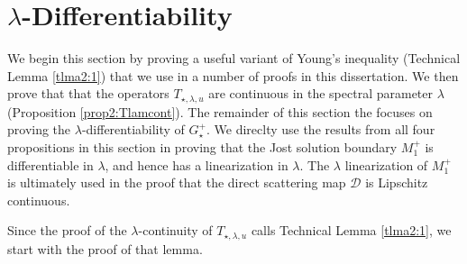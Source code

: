 \documentclass[../dissertation]{subfiles}
\begin{document}
\section{$\lambda$-Dif{}ferentiability}\label{sec2:diff}

We begin this section by proving a useful variant of Young's inequality
(Technical Lemma \ref{tlma2:1}) that we use in a number of proofs in this 
dissertation. We then prove that that the operators $T_{\star, \lambda, u}$ are
continuous in the spectral parameter $\lambda$ (Proposition 
\ref{prop2:Tlamcont}). The remainder of this section the focuses on proving the 
$\lambda$-dif{}ferentiability of $G_{\star}^+$. We direclty use the results 
from all four propositions in this section in proving that the Jost solution 
boundary $M_1^+$ is dif{}ferentiable in $\lambda$, and hence has a 
linearization in $\lambda$. The $\lambda$ linearization of $M_1^+$ is ultimately 
used in the proof that the direct scattering map $\mathscr D$ is Lipschitz 
continuous.

Since the proof of the $\lambda$-continuity of $T_{\star, \lambda, u}$ calls
Technical Lemma \ref{tlma2:1}, we start with the proof of that lemma.
\end{document}
